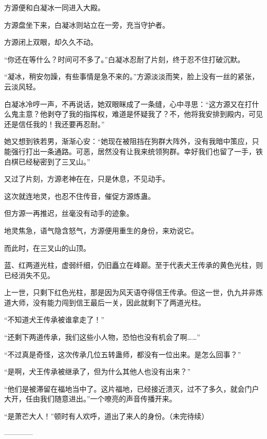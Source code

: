 \begin{this_body}
方源便和白凝冰一同进入大殿。

方源盘坐下来，白凝冰则站立在一旁，充当守护者。

方源闭上双眼，却久久不动。

“你还在等什么？时间可不多了。”白凝冰忍耐了片刻，终于忍不住打破沉默。

“凝冰，稍安勿躁，有些事情是急不来的。”方源淡淡而笑，脸上没有一丝的紧张，云淡风轻。

白凝冰冷哼一声，不再说话，她双眼眯成了一条缝，心中寻思：“这方源又在打什么鬼主意？他剥夺了我的指挥权，难道是怀疑我了？不，他将我安排到殿内，可见还是信任我的！我还要再忍耐。”

她又想到铁若男，渐渐心安：“她现在被阻挡在狗群大阵外，没有我暗中策应，只能强行打出一条通路。可恶，居然没有让我来统领狗群。幸好我们也留了一手，铁白棋已经秘密到了三叉山。”

又过了片刻，方源老神在在，只是休息，不见动手。

这次就连地灵，也忍不住传音，催促方源炼蛊。

但方源一再推迟，丝毫没有动手的迹象。

地灵焦急，语气隐含怒气，方源便用重生的身份，来劝说它。

而此时，在三叉山的山顶。

蓝、红两道光柱，虚弱纤细，仍旧矗立在峰巅。至于代表犬王传承的黄色光柱，则已经消失不见。

上一世，只剩下红色光柱，那是因为风天语夺得信王传承。但这一世，仇九并非炼道大师，没有能力闯到信王最后一关，因此就剩下了两道光柱。

“不知道犬王传承被谁拿走了！”

“还剩下两道传承，我们这些小人物，恐怕也没有机会了啊……”

“不过真是奇怪，这次传承几位五转蛊师，都没有一位出来。是怎么回事？”

“是啊，犬王传承被继承了，但为什么其他人也没有出来？”

“他们是被滞留在福地当中了。这片福地，已经接近溃灭，过不了多久，就会门户大开，任由我们随意进出。”一个嘹亮的声音传播开来。

“是萧芒大人！”顿时有人欢呼，道出了来人的身份。（未完待续）

------------

\end{this_body}

